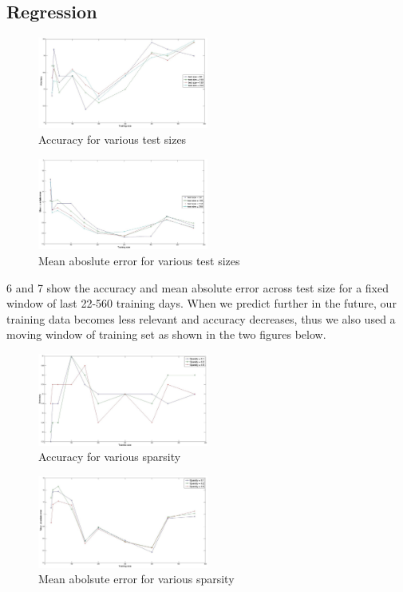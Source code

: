 \subsection{Regression}
\begin{figure}[H]
	\includegraphics[width=0.5\textwidth]{results/acc.jpg}
	\caption{Accuracy for various test sizes}
\end{figure}
\begin{figure}[H]
	\includegraphics[width=0.5\textwidth]{results/mae.jpg}
	\caption{Mean aboslute error for various test sizes}
\end{figure}
\figurename{6} and \figurename{7} show the accuracy and mean absolute error across test size for a fixed window of last 22-560 training days. When we predict further in the future, our training data becomes less relevant and accuracy decreases, thus we also used a moving window of training set as shown in the two figures below.
\begin{figure}[H]
	\includegraphics[width=0.5\textwidth]{results/acc2.jpg}
	\caption{Accuracy for various sparsity}
\end{figure}
\begin{figure}[H]
	\includegraphics[width=0.5\textwidth]{results/mae2.jpg}
	\caption{Mean abolsute error for various sparsity}
\end{figure}

